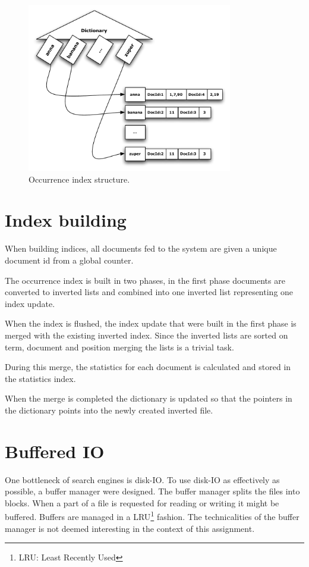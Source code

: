 \begin{figure}[h!!tb]
	\centering
	\includegraphics[width=0.8\textwidth]{include/index.pdf}
	\caption[Occurrence index structure]{Occurrence index structure.}\label{fig:occ_index_struct}
\end{figure}

\section{Index building}\label{sub:index_building}
When building indices, all documents fed to the system are given a unique document id from a global counter.

The occurrence index is built in two phases, in the first phase documents are converted to inverted lists and combined into one inverted list representing one index update. 

When the index is flushed, the index update that were built in the first phase is merged with the existing inverted index. Since the inverted lists are sorted on term, document and position merging the lists is a trivial task. 

During this merge, the statistics for each document is calculated and stored in the statistics index. 

When the merge is completed the dictionary is updated so that the pointers in the dictionary points into the newly created inverted file. 

\section{Buffered IO}\label{sec:buffered_io}
One bottleneck of search engines is disk-IO. To use disk-IO as effectively as possible, a buffer manager were designed. The buffer manager splits the files into blocks. When a part of a file is requested for reading or writing it might be buffered. Buffers are managed in a LRU\footnote{LRU: Least Recently Used} fashion. The technicalities of the buffer manager is not deemed interesting in the context of this assignment. 

